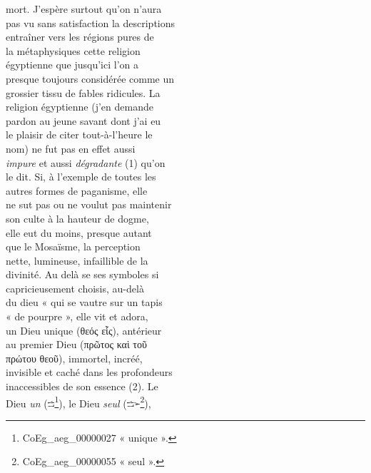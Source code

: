\documentclass{book}
\begin{document}
{\begin{paracol}{2}
mort. J’espère surtout qu’on n’aura\\
pas vu sans satisfaction la descriptions\\
entraîner vers les régions pures de\\
la métaphysiques cette religion\\
égyptienne que jusqu’ici l’on a\\
presque toujours considérée comme un\\
grossier tissu de fables ridicules. La\\
religion égyptienne (j’en demande\\
pardon au jeune savant dont j’ai eu\\
le plaisir de citer tout-à-l’heure le\\
nom) ne fut pas en effet aussi\\
\textit{impure} et aussi \textit{dégradante} (1) qu’on\\
le dit. Si, à l’exemple de toutes les\\
autres formes de paganisme, elle\\
ne sut pas ou ne voulut pas maintenir\\
son culte à la hauteur de dogme,\\
elle eut du moins, presque autant\\
que le Mosaïsme, la perception\\
nette, lumineuse, infaillible de la\\
divinité. Au delà se ses symboles si\\
capricieusement choisis, au-delà\\
du dieu « qui se vautre sur un tapis\\
« de pourpre », elle vit et adora,\\
un Dieu unique (θεός εἷς), antérieur\\
au premier Dieu (πρῶτος καὶ τοῦ\\
πρώτου θεοῦ), immortel, incréé,\\
invisible et caché dans les profondeurs\\
inaccessibles de son essence (2). Le\\
Dieu \textit{un} (\includegraphics[height=6pt]{CoEg_Mariette_hiero_1857-04-01_31_1.png}\footnote{\foreignlanguage{translit}{\Gls{CoEg_aeg_00000027}} « unique ».}), le Dieu \textit{seul} (\includegraphics[height=6pt]{CoEg_Mariette_hiero_1857-04-01_31_2.png}\footnote{\foreignlanguage{translit}{\Gls{CoEg_aeg_00000055}} « seul ».}),\\

\end{paracol}}
\end{document}
